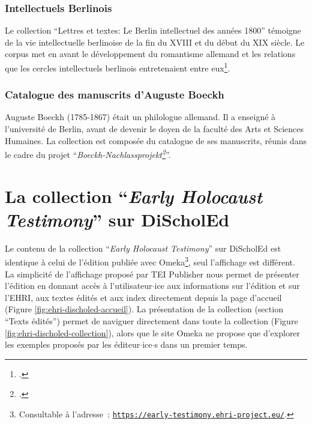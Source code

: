\subsubsection*{Intellectuels Berlinois}
Le collection \enquote{Lettres et textes: Le Berlin intellectuel des années 1800} témoigne de la vie intellectuelle berlinoise de la fin du XVIII\ieme{} et du début du XIX\ieme{} siècle. Le corpus met en avant le développement du romantisme allemand et les relations que les cercles intellectuels berlinois entretenaient entre eux\footcite[collection \enquote{Lettres et textes: Le Berlin intellectuel des années 1800}, section \enquote{\textit{History of the Corpus}} (visité le 03/09/2023)]{DiScholEd}.

\subsubsection*{Catalogue des manuscrits d'Auguste Boeckh}
Auguste Boeckh (1785-1867) était un philologue allemand. Il a enseigné à l'université de Berlin, avant de devenir le doyen de la faculté des Arts et Sciences Humaines. La collection est composée du catalogue de ses manuscrits, réunis dans le cadre du projet \enquote{\textit{Boeckh-Nachlassprojekt\footcite[collection \enquote{Catalogue des manuscrits d'Auguste Boeckh}, section \enquote{\textit{History of the Corpus}} (visité le 03/09/2023)]{DiScholEd}}}.  



\section{La collection \enquote{\textit{Early Holocaust Testimony}} sur DiScholEd}
Le contenu de la collection \enquote{\textit{Early Holocaust Testimony}} sur DiScholEd est identique à celui de l'édition publiée avec Omeka\footnote{Consultable à l'adresse~: \texttt{\href{https://early-testimony.ehri-project.eu/}{https://early-testimony.ehri-project.eu/}}.}, seul l'affichage est différent. La simplicité de l'affichage proposé par TEI Publisher nous permet de présenter l'édition en donnant accès à l'utilisateur$\cdot$ice aux informations sur l'édition et sur l'EHRI, aux textes édités et aux index directement depuis la page d'accueil (Figure \ref{fig:ehri-discholed-accueil}). La présentation de la collection (section \enquote{Texts édités}) permet de naviguer directement dans toute la collection (Figure \ref{fig:ehri-discholed-collection}), alors que le site Omeka ne propose que d'explorer les exemples proposés par les éditeur$\cdot$ice$\cdot$s dans un premier temps.  


